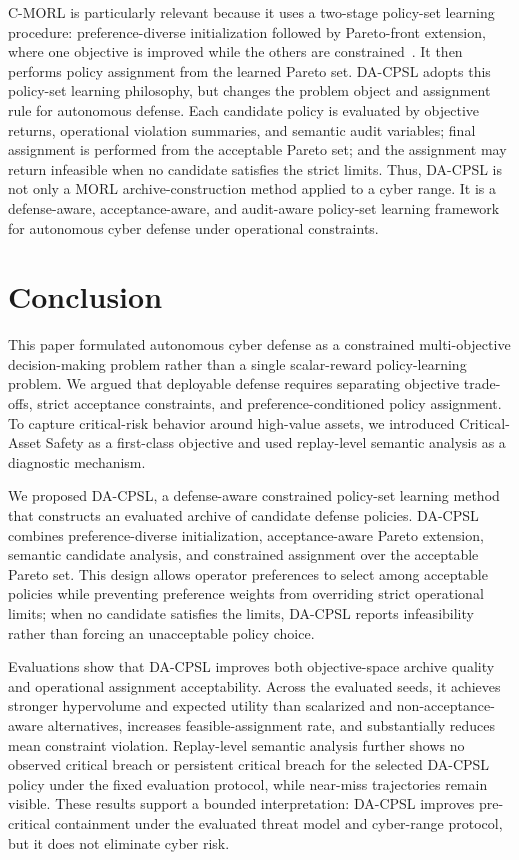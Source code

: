 \documentclass[sigconf,review,anonymous]{acmart}
\begin{document}
C-MORL is particularly relevant because it uses a two-stage policy-set
learning procedure: preference-diverse initialization followed by
Pareto-front extension, where one objective is improved while the others
are constrained~\cite{liu2025cmorl,huang2022constrainedmorl,laumanns2006epsilon}. It then performs policy assignment
from the learned Pareto set. DA-CPSL adopts this policy-set learning
philosophy, but changes the problem object and assignment rule for
autonomous defense. Each candidate policy is evaluated by objective
returns, operational violation summaries, and semantic audit variables;
final assignment is performed from the acceptable Pareto set; and the
assignment may return infeasible when no candidate satisfies the strict
limits. Thus, DA-CPSL is not only a MORL archive-construction method
applied to a cyber range. It is a defense-aware, acceptance-aware, and
audit-aware policy-set learning framework for autonomous cyber defense
under operational constraints.

\section{Conclusion}
\label{sec:conclusion}

This paper formulated autonomous cyber defense as a constrained multi-objective decision-making problem rather than a single scalar-reward policy-learning problem.
We argued that deployable defense requires separating objective trade-offs, strict acceptance constraints, and preference-conditioned policy assignment.
To capture critical-risk behavior around high-value assets, we introduced Critical-Asset Safety as a first-class objective and used replay-level semantic analysis as a diagnostic mechanism.

We proposed DA-CPSL, a defense-aware constrained policy-set learning method that constructs an evaluated archive of candidate defense policies.
DA-CPSL combines preference-diverse initialization, acceptance-aware Pareto extension, semantic candidate analysis, and constrained assignment over the acceptable Pareto set.
This design allows operator preferences to select among acceptable policies while preventing preference weights from overriding strict operational limits; when no candidate satisfies the limits, DA-CPSL reports infeasibility rather than forcing an unacceptable policy choice.

Evaluations show that DA-CPSL improves both objective-space archive quality and operational assignment acceptability.
Across the evaluated seeds, it achieves stronger hypervolume and expected utility than scalarized and non-acceptance-aware alternatives, increases feasible-assignment rate, and substantially reduces mean constraint violation.
Replay-level semantic analysis further shows no observed critical breach or persistent critical breach for the selected DA-CPSL policy under the fixed evaluation protocol, while near-miss trajectories remain visible.
These results support a bounded interpretation: DA-CPSL improves pre-critical containment under the evaluated threat model and cyber-range protocol, but it does not eliminate cyber risk.
\end{document}
